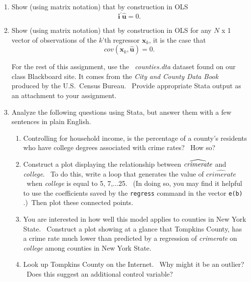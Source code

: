 \documentclass[11pt]{article}
\begin{document}
\begin{enumerate}
\item Show (using matrix notation) that by construction in OLS 
\begin{equation*}
\mathbf{i}^{\prime }\widehat{\mathbf{u}}=0.
\end{equation*}

\item Show (using matrix notation) that by construction in OLS for any $N$ x
1 vector of observations of the $k$'th regressor $\mathbf{x}_{k}$, it is the
case that%
\begin{equation*}
cov\left( \mathbf{x}_{k},\widehat{\mathbf{u}}\right) =0.
\end{equation*}%
\bigskip

For the rest of this assignment, use the \textit{\ counties.dta} dataset
found on our class Blackboard site. It comes from the \textit{City and
County Data Book }produced by the U.S.\ Census Bureau. \ Provide appropriate
Stata output as an attachment to your assignment.

\item Analyze the following questions using Stata, but answer them with a
few sentences in plain English. \ 

\begin{enumerate}
\item Controlling for household income, is the percentage of a county's
residents who have college degrees associated with crime rates? \ How so?

\item Construct a plot displaying the relationship between $\widehat{\mathit{%
crimerate}}$ and \textit{college}. \ To do this, write a loop that generates
the value of $\widehat{\mathit{crimerate}}$ \ when \textit{college }is equal
to 5, 7,...25. \ (In doing so, you may find it helpful to use the
coefficients saved by the \texttt{regress} command in the vector \texttt{e(b)%
}.)\ Then plot these connected points.

\item You are interested in how well this model applies to counties in New
York State. \ Construct a plot showing at a glance that Tompkins County, has
a crime rate much lower than predicted by a regression of \textit{crimerate}
on \textit{college }among counties in New York State.

\item Look up Tompkins County on the Internet. \ Why might it be an outlier?
\ Does this suggest an additional control variable?\bigskip
\end{enumerate}


\end{enumerate}
\end{document}
